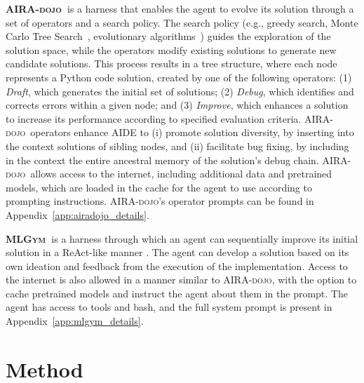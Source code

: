 \documentclass{fairmeta}
\newcommand{\airadojo}{\textsc{AIRA-dojo}}
\newcommand{\mlgym}{\textsc{MLGym}}
\begin{document}
\textbf{\airadojo~}is a harness that enables the agent to evolve its solution through a set of operators and a search policy. The search policy (e.g., greedy search, Monte Carlo Tree Search~\citep{Kocsis2006}, evolutionary algorithms~\citep{novikov2025alphaevolvecodingagentscientific,openevolve,FunSearch2023}) guides the exploration of the solution space, while the operators modify existing solutions to generate new candidate solutions. This process results in a tree structure, where each node represents a Python code solution, created by one of the
following operators: (1) \textit{Draft}, which generates the initial set of solutions; (2) \textit{Debug}, which identifies and corrects errors within a given node; and (3) \textit{Improve}, which enhances a solution to increase its performance according to specified evaluation criteria. \airadojo~operators enhance AIDE to (i) promote solution diversity, by inserting into the context solutions of sibling nodes, and (ii) facilitate bug fixing, by including in the context the entire ancestral memory of the solution's debug chain. \airadojo~allows access to the internet, including additional data and pretrained models, which are loaded in the cache for the agent to use according to prompting instructions. \airadojo's operator prompts can be found in Appendix~\ref{app:airadojo_details}.


\textbf{\mlgym~}is a harness through which an agent can sequentially improve its initial solution in a ReAct-like manner \citep{yao2023react}. The agent can develop a solution based on its own ideation and feedback from the execution of the implementation. Access to the internet is also allowed in a manner similar to \airadojo, with the option to cache pretrained models and instruct the agent about them in the prompt. The agent has access to tools and bash, and the full system prompt is present in Appendix~\ref{app:mlgym_details}.






\section{Method}
\label{sec:method}
\end{document}
